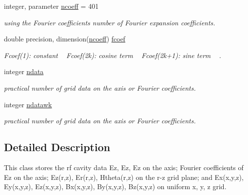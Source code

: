 \textbf{ }\par
\begin{DoxyCompactItemize}
\item 
integer, parameter \mbox{\hyperlink{namespacedataclass_aea44837b0eb59e9b5a864f3a59c7facc}{ncoeff}} = 401
\begin{DoxyCompactList}\small\item\em using the Fourier coefficients number of Fourier expansion coefficients. \end{DoxyCompactList}\item 
double precision, dimension(\mbox{\hyperlink{namespacedataclass_aea44837b0eb59e9b5a864f3a59c7facc}{ncoeff}}) \mbox{\hyperlink{namespacedataclass_ac8605e11e3fc14fbebbc843cc36c2836}{fcoef}}
\begin{DoxyCompactList}\small\item\em Fcoef(1)\+: constant ~\newline
 Fcoef(2k)\+: cosine term ~\newline
 Fcoef(2k+1)\+: sine term ~\newline
. \end{DoxyCompactList}\end{DoxyCompactItemize}

\textbf{ }\par
\begin{DoxyCompactItemize}
\item 
integer \mbox{\hyperlink{namespacedataclass_a72f075bdeedd35dc0962289e6f3461ba}{ndata}}
\begin{DoxyCompactList}\small\item\em practical number of grid data on the axis or Fourier coefficients. \end{DoxyCompactList}\item 
integer \mbox{\hyperlink{namespacedataclass_ae1faef34fdc08790ab0a4d85650d797f}{ndatawk}}
\begin{DoxyCompactList}\small\item\em practical number of grid data on the axis or Fourier coefficients. \end{DoxyCompactList}\end{DoxyCompactItemize}



\subsection{Detailed Description}
This class stores the rf cavity data Ez, Ez\textquotesingle{}, Ez\textquotesingle{}\textquotesingle{} on the axis; Fourier coefficients of Ez on the axis; Ez(r,z), Er(r,z), Htheta(r,z) on the r-\/z grid plane; and Ex(x,y,z), Ey(x,y,z), Ez(x,y,z), Bx(x,y,z), By(x,y,z), Bz(x,y,z) on uniform x, y, z grid. 

